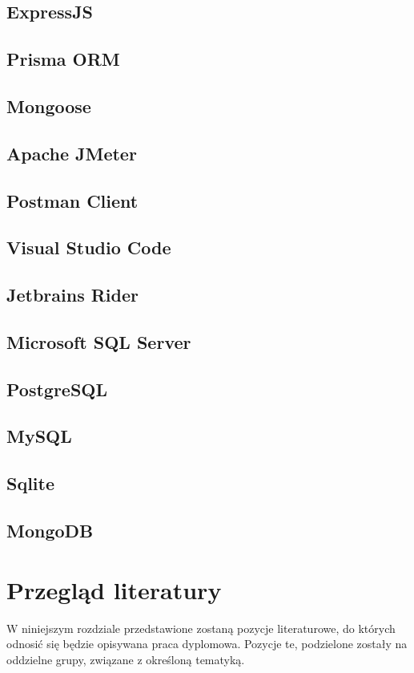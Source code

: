 \subsection*{ExpressJS}
\subsection*{Prisma ORM}
\subsection*{Mongoose}
\subsection*{Apache JMeter}
\subsection*{Postman Client}
\subsection*{Visual Studio Code}
\subsection*{Jetbrains Rider}
\subsection*{Microsoft SQL Server}
\subsection*{PostgreSQL}
\subsection*{MySQL}
\subsection*{Sqlite}
\subsection*{MongoDB}
\section{Przegląd literatury}
W niniejszym rozdziale przedstawione zostaną pozycje literaturowe, do których odnosić się będzie opisywana praca dyplomowa. Pozycje te, podzielone zostały na oddzielne grupy, związane z określoną tematyką.

